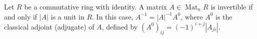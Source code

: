 Let $R$ be a commutative ring with identity. A matrix $A \in \operatorname{Mat}_n R$ is invertible if and only if $|A|$ is a unit in $R$. In this case, $A^{-1} = |A|^{-1} A^0$, where $A^0$ is the classical adjoint (adjugate) of $A$, defined by $(A^0)_{ij} = (-1)^{i+j} |A_{ji}|$.
